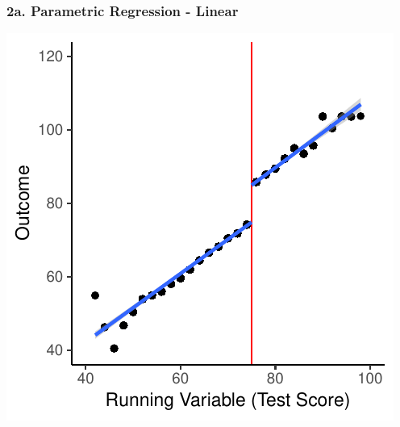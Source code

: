 \documentclass[xcolor=x11names,compress]{beamer}\usepackage[]{graphicx}\usepackage[]{color}
\makeatletter
\def\maxwidth{ %
  \ifdim\Gin@nat@width>\linewidth
    \linewidth
  \else
    \Gin@nat@width
  \fi
}
\newenvironment{knitrout}{}{} %
\renewcommand{\(}{\begin{columns}}
\renewcommand{\)}{\end{columns}}
\newcommand{\<}[1]{\begin{column}{#1}}
\renewcommand{\>}{\end{column}}
\makeatother
\begin{document}
\begin{frame}
\frametitle{2a. Parametric Regression - Linear}
\begin{center}
\begin{knitrout}
\color{fgcolor}
\includegraphics[width=\maxwidth]{figure/chart4-1} 

\end{knitrout}
\end{center}
\end{frame}
\end{document}
